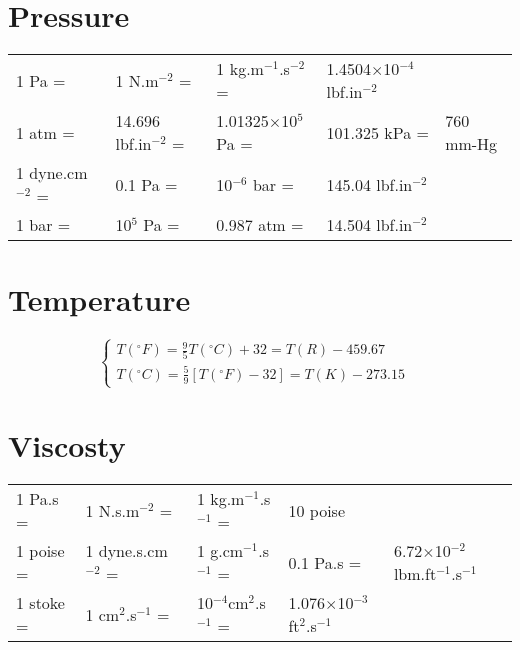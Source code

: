\documentclass[11pts,a4paper,amsmath,amssymb,floatfix]{article}
\newcommand{\frc}{\displaystyle\frac}
\begin{document}
\section{Pressure}\label{Chapter:UnitConversion:Section:Pressure}
     \begin{center}
     \begin{tabular}{|l l l l l|}
       \hline
       1 Pa =& 1 N.m$^{-2}$ =& 1 kg.m$^{-1}$.s$^{-2}$ =& 1.4504$\times$10$^{-4}$ lbf.in$^{-2}$ & \\
       1 atm =& 14.696 lbf.in$^{-2}$ =& 1.01325$\times$10$^{5}$ Pa =& 101.325 kPa =& 760 mm-Hg \\
       1 dyne.cm$^{-2}$ =& 0.1 Pa =& 10$^{-6}$ bar =& 145.04 lbf.in$^{-2}$ & \\
       1 bar =& 10$^{5}$ Pa =& 0.987 atm =& 14.504 lbf.in$^{-2}$ & \\
       \hline           
     \end{tabular}
     \end{center}
     
     \section{Temperature}\label{Chapter:UnitConversion:Section:Temperature}
     \begin{displaymath}
       \begin{cases}
         T\left(^{\circ}F\right) = \frc{9}{5}T\left(^{\circ}C\right) + 32 = T(R) - 459.67 & \\
         T\left(^{\circ}C\right) = \frc{5}{9}\left[T\left(^{\circ}F\right)-32\right] = T(K) - 273.15 & 
       \end{cases}      
     \end{displaymath}
     
     \section{Viscosty}\label{Chapter:UnitConversion:Section:Viscosity}
     \begin{center}
     \begin{tabular}{|l l l l l|}
       \hline
       1 Pa.s =& 1 N.s.m$^{-2}$ =& 1 kg.m$^{-1}$.s$^{-1}$ =& 10 poise &   \\
       1 poise =& 1 dyne.s.cm$^{-2}$ =& 1 g.cm$^{-1}$.s$^{-1}$ =& 0.1 Pa.s =& 6.72$\times$10$^{-2}$ lbm.ft$^{-1}$.s$^{-1}$\\
       1 stoke =& 1 cm$^{2}$.s$^{-1}$ =& 10$^{-4}$cm$^{2}$.s$^{-1}$ =& 1.076$\times$10$^{-3}$ ft$^{2}$.s$^{-1}$ & \\
       \hline           
     \end{tabular}
     \end{center}
     


 
   
\end{document}
